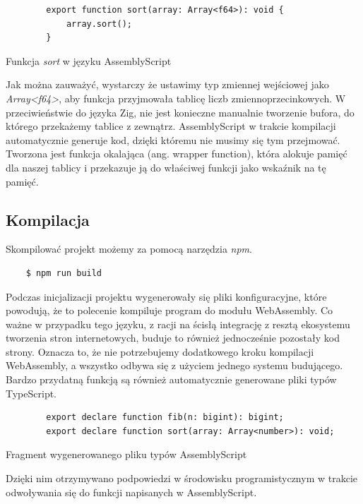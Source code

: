 \documentclass[language=polish,type=master]{aghmodern}
\begin{document}
\begin{listing}[H]
    \begin{verbatim}
        export function sort(array: Array<f64>): void {
            array.sort();
        }
    \end{verbatim}
    \caption{Funkcja \emph{sort} w języku AssemblyScript}
\end{listing}

Jak można zauważyć, wystarczy że ustawimy typ zmiennej wejściowej jako \emph{Array<f64>}, aby funkcja przyjmowała tablicę liczb zmiennoprzecinkowych.
W przeciwieństwie do języka Zig, nie jest konieczne manualnie tworzenie bufora, do którego przekażemy tablice z zewnątrz.
AssemblyScript w trakcie kompilacji automatycznie generuje kod, dzięki któremu nie musimy się tym przejmować.
Tworzona jest funkcja okalająca (ang. wrapper function), która alokuje pamięć dla naszej tablicy i przekazuje ją do właściwej funkcji jako wskaźnik na tę pamięć.

\subsection{Kompilacja}
Skompilować projekt możemy za pomocą narzędzia \emph{npm}.

\begin{verbatim}
    $ npm run build
\end{verbatim}

Podczas inicjalizacji projektu wygenerowały się pliki konfiguracyjne, które powodują, że to polecenie kompiluje program do modułu WebAssembly.
Co ważne w przypadku tego języku, z racji na ścisłą integrację z resztą ekosystemu tworzenia stron internetowych, buduje to również jednocześnie pozostały kod strony.
Oznacza to, że nie potrzebujemy dodatkowego kroku kompilacji WebAssembly, a wszystko odbywa się z użyciem jednego systemu budującego.
Bardzo przydatną funkcją są również automatycznie generowane pliki typów TypeScript.

\begin{listing}[H]
    \begin{verbatim}
        export declare function fib(n: bigint): bigint;
        export declare function sort(array: Array<number>): void;
    \end{verbatim}
    \caption{Fragment wygenerowanego pliku typów AssemblyScript}
\end{listing}

Dzięki nim otrzymywano podpowiedzi w środowisku programistycznym w trakcie odwoływania się do funkcji napisanych w AssemblyScript.
\end{document}
